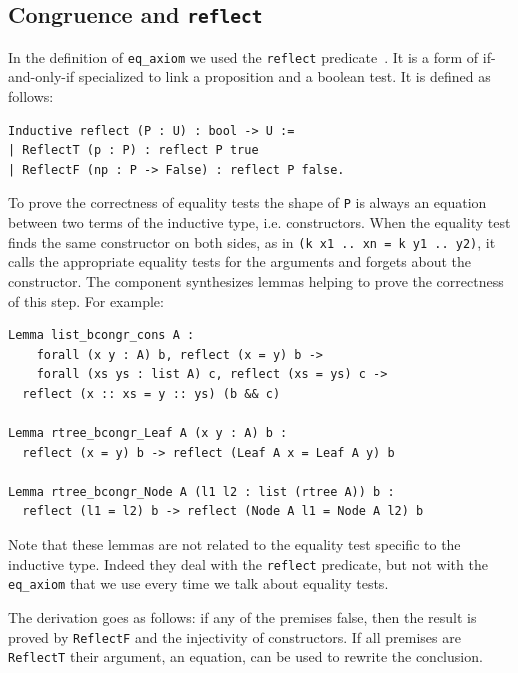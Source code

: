 \documentclass[sigplan,10pt,review]{acmart}\settopmatter{printfolios=true,printccs=false,printacmref=false}
\newcommand{\derive}[1]{\keys{#1}}
\begin{document}
\subsection{Congruence and \lstinline+reflect+} %
\label{sec:reflect}

In the definition of \lstinline+eq_axiom+ we used the \lstinline+reflect+
predicate~\cite{mcb}. It is a form of if-and-only-if specialized to link a
proposition and a boolean test. It is defined as follows:

\begin{minipage}{\textwidth}\begin{lstlisting}
Inductive reflect (P : U) : bool -> U :=
| ReflectT (p : P) : reflect P true
| ReflectF (np : P -> False) : reflect P false.
\end{lstlisting}\end{minipage}

\noindent
To prove the correctness of equality tests the shape of
\lstinline+P+ is always an equation between two terms of
the inductive type, i.e. constructors.
When the equality test finds the same constructor on both sides, as in
\lstinline+(k x1 .. xn = k y1 .. y2)+, it
calls the appropriate equality tests for the arguments and forgets about
the constructor. The \derive{bcongr} component synthesizes lemmas
helping to prove the correctness of this step. For example:

\begin{minipage}{\textwidth}\begin{lstlisting}
Lemma list_bcongr_cons A :
    forall (x y : A) b, reflect (x = y) b ->
    forall (xs ys : list A) c, reflect (xs = ys) c ->
  reflect (x :: xs = y :: ys) (b && c)

Lemma rtree_bcongr_Leaf A (x y : A) b :
  reflect (x = y) b -> reflect (Leaf A x = Leaf A y) b

Lemma rtree_bcongr_Node A (l1 l2 : list (rtree A)) b :
  reflect (l1 = l2) b -> reflect (Node A l1 = Node A l2) b
\end{lstlisting}\end{minipage}

\noindent
Note that these lemmas are not related to the
equality test specific to the inductive type. Indeed they deal
with the \lstinline+reflect+ predicate, but not with the
\lstinline+eq_axiom+ that we use every time we talk about equality tests.

The derivation goes as follows: if any of the premises
false, then the result is proved by
\lstinline+ReflectF+ and the injectivity of constructors.
If all premises are \lstinline+ReflectT+ their argument,
an equation, can be used to rewrite the conclusion.
\end{document}
